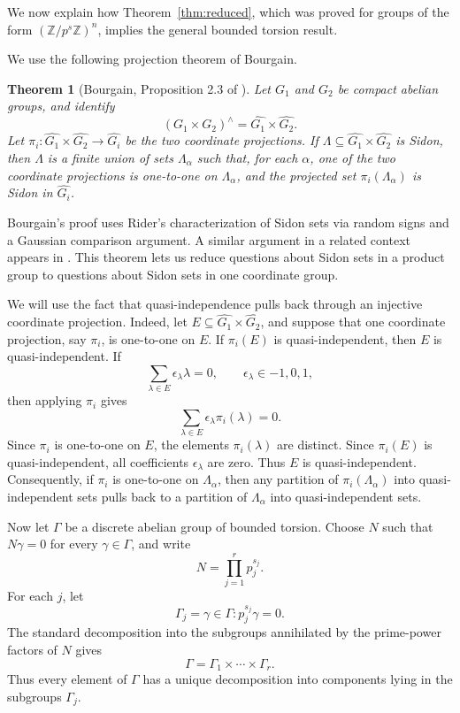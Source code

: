 \documentclass[11pt]{amsart}
\newtheorem{theorem}{Theorem}[section]
\newcommand{\Z}{\mathbb{Z}}
\begin{document}
We now explain how Theorem~\ref{thm:reduced}, which was proved for groups of the form $(\Z/p^s\Z)^n$, implies the general bounded torsion result.

We use the following projection theorem of Bourgain.

\begin{theorem}[Bourgain, Proposition 2.3 of \cite{B83}]
\label{thm:bourgain-reduction}
Let $G_1$ and $G_2$ be compact abelian groups, and identify
$$
(G_1\times G_2)^\wedge
=
\widehat{G_1}\times \widehat{G_2}.
$$
Let $\pi_i\colon \widehat{G_1}\times \widehat{G_2}\to \widehat{G_i}$ be the two coordinate projections. If $\Lambda\subseteq \widehat{G_1}\times \widehat{G_2}$ is Sidon, then $\Lambda$ is a finite union of sets $\Lambda_\alpha$ such that, for each $\alpha$, one of the two coordinate projections is one-to-one on $\Lambda_\alpha$, and the projected set $\pi_i(\Lambda_\alpha)$ is Sidon in $\widehat{G_i}$.
\end{theorem}

Bourgain's proof uses Rider's characterization of Sidon sets via random signs and a Gaussian comparison argument. A similar argument in a related context appears in \cite{BL}. This theorem lets us reduce questions about Sidon sets in a product group to questions about Sidon sets in one coordinate group.

We will use the fact that quasi-independence pulls back through an injective coordinate projection. Indeed, let $E\subseteq \widehat{G_1}\times\widehat{G_2}$, and suppose that one coordinate projection, say $\pi_i$, is one-to-one on $E$. If $\pi_i(E)$ is quasi-independent, then $E$ is quasi-independent. If
$$
\sum_{\lambda\in E}\epsilon_\lambda \lambda=0,
\qquad \epsilon_\lambda\in{-1,0,1},
$$
then applying $\pi_i$ gives
$$
\sum_{\lambda\in E}\epsilon_\lambda \pi_i(\lambda)=0.
$$
Since $\pi_i$ is one-to-one on $E$, the elements $\pi_i(\lambda)$ are distinct. Since $\pi_i(E)$ is quasi-independent, all coefficients $\epsilon_\lambda$ are zero. Thus $E$ is quasi-independent. Consequently, if $\pi_i$ is one-to-one on $\Lambda_\alpha$, then any partition of $\pi_i(\Lambda_\alpha)$ into quasi-independent sets pulls back to a partition of $\Lambda_\alpha$ into quasi-independent sets.

Now let $\Gamma$ be a discrete abelian group of bounded torsion. Choose $N$ such that $N\gamma=0$ for every $\gamma\in\Gamma$, and write
$$
N=\prod_{j=1}^r p_j^{s_j}.
$$
For each $j$, let
$$
\Gamma_j={\gamma\in\Gamma:p_j^{s_j}\gamma=0}.
$$
The standard decomposition into the subgroups annihilated by the prime-power factors of $N$ gives
$$
\Gamma=\Gamma_1\times\cdots\times\Gamma_r.
$$
Thus every element of $\Gamma$ has a unique decomposition into components lying in the subgroups $\Gamma_j$.
\end{document}
